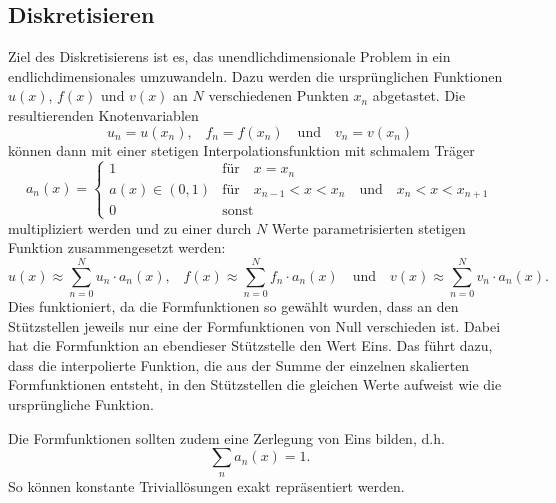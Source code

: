 \subsection{Diskretisieren\label{fem:1d:diskretisieren}}
Ziel des Diskretisierens ist es, das unendlichdimensionale Problem in ein endlichdimensionales umzuwandeln.
Dazu werden die ursprünglichen Funktionen $u(x)$, $f(x)$ und $v(x)$ an $N$ verschiedenen Punkten $x_n$ abgetastet.
Die resultierenden Knotenvariablen
%
\begin{equation*}
    u_n = u(x_n) 
    \text{,} \quad
    f_n = f(x_n)
    \quad \text{und} \quad
    v_n = v(x_n)
\end{equation*}
können dann mit einer stetigen Interpolationsfunktion mit schmalem Träger
%
\begin{equation*}
    a_n(x) = \left\{ \begin{array}{ll}
        1
            & \text{für} \quad x = x_n \\
        a(x) \in (0, 1) 
            & \text{für} \quad x_{n-1} < x < x_n \quad \text{und} \quad x_n < x < x_{n+1} \\
        0
            & \text{sonst} 
    \end{array} \right.
\end{equation*}
multipliziert werden und zu einer durch $N$ Werte parametrisierten stetigen Funktion zusammengesetzt werden:
\begin{equation*}
    u(x) \approx \sum_{n=0}^{N}{u_n \cdot a_n(x)} 
    \text{,} \quad
    f(x) \approx \sum_{n=0}^{N}{f_n \cdot a_n(x)} 
    \quad \text{und} \quad
    v(x) \approx \sum_{n=0}^{N}{v_n \cdot a_n(x)}.
\end{equation*}
Dies funktioniert, da die Formfunktionen so gewählt wurden, dass an den Stützstellen jeweils nur eine der Formfunktionen von Null verschieden ist.
Dabei hat die Formfunktion an ebendieser Stützstelle den Wert Eins.
Das führt dazu, dass die interpolierte Funktion, die aus der Summe der einzelnen skalierten Formfunktionen entsteht, in den Stützstellen die gleichen Werte aufweist wie die ursprüngliche Funktion.

Die Formfunktionen sollten zudem eine Zerlegung von Eins bilden, d.h.
\begin{equation}
    \sum_{n} a_n(x) = 1. \label{fem:1d:zerlegung_v_eins}
\end{equation}
So können konstante Triviallösungen exakt repräsentiert werden.

